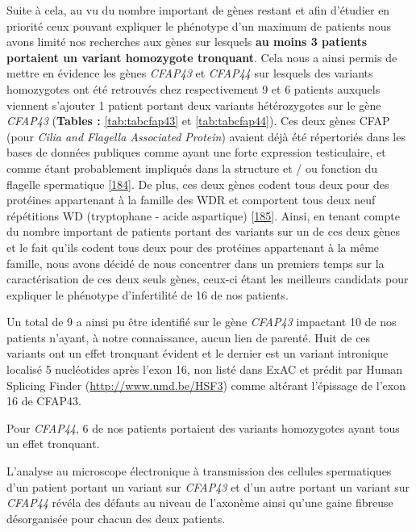 \documentclass[12pt,a4paper,twoside]{ugathesis}
\theoremstyle{definition}
\theoremstyle{definition}
\theoremstyle{definition}
\theoremstyle{remark}
\begin{document}
Suite à cela, au vu du nombre important de gènes restant et afin
d'étudier en priorité ceux pouvant expliquer le phénotype d'un maximum
de patients nous avons limité nos recherches aux gènes sur lesquels
\textbf{au moins 3 patients portaient un variant homozygote tronquant}.
Cela nous a ainsi permis de mettre en évidence les gènes \emph{CFAP43}
et \emph{CFAP44} sur lesquels des variants homozygotes ont été retrouvés
chez respectivement 9 et 6 patients auxquels viennent s'ajouter 1
patient portant deux variants hétérozygotes sur le gène \emph{CFAP43}
(\textbf{Tables : }\ref{tab:tabcfap43} et \ref{tab:tabcfap44}). Ces deux
gènes CFAP (pour \emph{Cilia and Flagella Associated Protein}) avaient
déjà été répertoriés dans les bases de données publiques comme ayant une
forte expression testiculaire, et comme étant probablement impliqués
dans la structure et / ou fonction du flagelle spermatique
{[}\protect\hyperlink{ref-Ivliev2012}{184}{]}. De plus, ces deux gènes
codent tous deux pour des protéines appartenant à la famille des WDR et
comportent tous deux neuf répétitions WD (tryptophane - acide
aspartique) {[}\protect\hyperlink{ref-Smith2008}{185}{]}. Ainsi, en
tenant compte du nombre important de patients portant des variants sur
un de ces deux gènes et le fait qu'ils codent tous deux pour des
protéines appartenant à la même famille, nous avons décidé de nous
concentrer dans un premiers temps sur la caractérisation de ces deux
seuls gènes, ceux-ci étant les meilleurs candidats pour expliquer le
phénotype d'infertilité de 16 de nos patients.

Un total de 9 a ainsi pu être identifié sur le gène \emph{CFAP43}
impactant 10 de nos patients n'ayant, à notre connaissance, aucun lien
de parenté. Huit de ces variants ont un effet tronquant évident et le
dernier est un variant intronique localisé 5 nucléotides après l'exon
16, non listé dans ExAC et prédit par Human Splicing Finder
(\url{http://www.umd.be/HSF3}) comme altérant l'épissage de l'exon 16 de
CFAP43.

Pour \emph{CFAP44}, 6 de nos patients portaient des variants homozygotes
ayant tous un effet tronquant.

L'analyse au microscope électronique à transmission des cellules
spermatiques d'un patient portant un variant sur \emph{CFAP43} et d'un
autre portant un variant sur \emph{CFAP44} révéla des défauts au niveau
de l'axonème ainsi qu'une gaine fibreuse désorganisée pour chacun des
deux patients.
\end{document}
